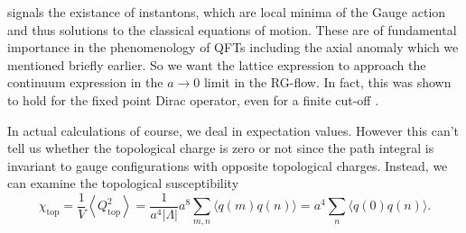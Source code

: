 \documentclass[a4paper,10pt]{book}
\begin{document}
signals the existance of instantons, which are local minima of the Gauge action and thus  solutions to the classical equations of motion. These are of fundamental importance in the phenomenology of QFTs including the axial anomaly which we mentioned briefly earlier. So we want the lattice expression to approach the continuum expression in the $a\rightarrow 0$ limit in the RG-flow. In fact, this was shown to hold for the fixed point Dirac operator, even for a finite cut-off \cite{Hasenfratz_1998}.\par In actual calculations of course, we deal in expectation values. However this can't tell us whether the topological charge is zero or not since the path integral is invariant to gauge configurations with opposite topological charges. Instead, we can examine the topological susceptibility
\begin{equation}\label{eq:topological_susc}
\chi_{\mathrm{top}}=\frac{1}{V}\left\langle Q_{\mathrm{top}}^{2}\right\rangle=\frac{1}{a^{4}|\Lambda|} a^{8} \sum_{m, n}\langle q(m) q(n)\rangle=a^{4} \sum_{n}\langle q(0) q(n)\rangle.
\end{equation}
\end{document}
